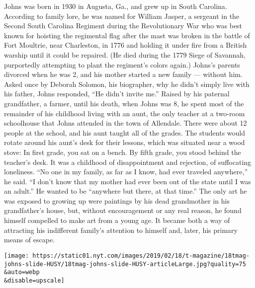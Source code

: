 Johns was born in 1930 in Augusta, Ga., and grew up in South Carolina.
According to family lore, he was named for William Jasper, a sergeant in
the Second South Carolina Regiment during the Revolutionary War who was
best known for hoisting the regimental flag after the mast was broken in
the battle of Fort Moultrie, near Charleston, in 1776 and holding it
under fire from a British warship until it could be repaired. (He died
during the 1779 Siege of Savannah, purportedly attempting to plant the
regiment's colors again.) Johns's parents divorced when he was 2, and
his mother started a new family --- without him. Asked once by Deborah
Solomon, his biographer, why he didn't simply live with his father,
Johns responded, ``He didn't invite me.'' Raised by his paternal
grandfather, a farmer, until his death, when Johns was 8, he spent most
of the remainder of his childhood living with an aunt, the only teacher
at a two-room schoolhouse that Johns attended in the town of Allendale.
There were about 12 people at the school, and his aunt taught all of the
grades. The students would rotate around his aunt's desk for their
lessons, which was situated near a wood stove: In first grade, you sat
on a bench. By fifth grade, you stood behind the teacher's desk. It was
a childhood of disappointment and rejection, of suffocating loneliness.
``No one in my family, as far as I know, had ever traveled anywhere,''
he said. ``I don't know that my mother had ever been out of the state
until I was an adult.'' He wanted to be ``anywhere but there, at that
time.'' The only art he was exposed to growing up were paintings by his
dead grandmother in his grandfather's house, but, without encouragement
or any real reason, he found himself compelled to make art from a young
age. It became both a way of attracting his indifferent family's
attention to himself and, later, his primary means of escape.

\texttt{[image: https://static01.nyt.com/images/2019/02/18/t-magazine/18tmag-johns-slide-HUSY/18tmag-johns-slide-HUSY-articleLarge.jpg?quality=75\\\&auto=webp\\\&disable=upscale]}

